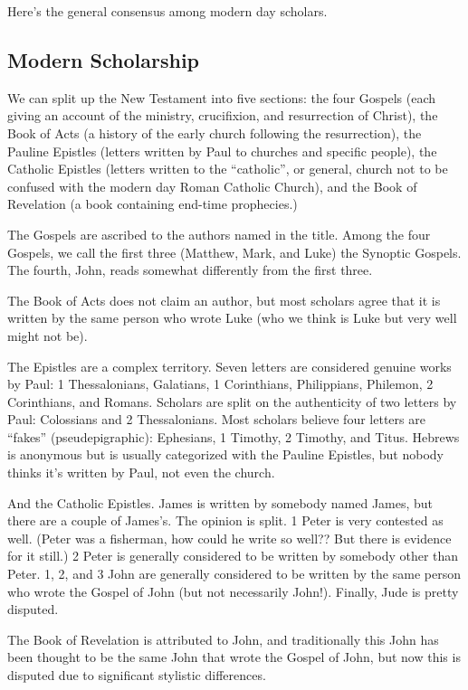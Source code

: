 \documentclass[12pt,letterpaper]{article}
\begin{document}
Here's the general consensus among modern day scholars.

\subsection{Modern Scholarship}

We can split up the New Testament into five sections: the four Gospels (each giving an account of the ministry, crucifixion, and resurrection of Christ), the Book of Acts (a history of the early church following the resurrection), the Pauline Epistles (letters written by Paul to churches and specific people), the Catholic Epistles (letters written to the ``catholic'', or general, church not to be confused with the modern day Roman Catholic Church), and the Book of Revelation (a book containing end-time prophecies.)

The Gospels are ascribed to the authors named in the title.  Among the four Gospels, we call the first three (Matthew, Mark, and Luke) the Synoptic Gospels.  The fourth, John, reads somewhat differently from the first three.

The Book of Acts does not claim an author, but most scholars agree that it is written by the same person who wrote Luke (who we think is Luke but very well might not be).  

The Epistles are a complex territory.  Seven letters are considered genuine works by Paul: 1 Thessalonians, Galatians, 1 Corinthians, Philippians, Philemon, 2 Corinthians, and Romans.  Scholars are split on the authenticity of two letters by Paul: Colossians and 2 Thessalonians.  Most scholars believe four letters are ``fakes'' (pseudepigraphic): Ephesians, 1 Timothy, 2 Timothy, and Titus.  Hebrews is anonymous but is usually categorized with the Pauline Epistles, but nobody thinks it's written by Paul, not even the church.

And the Catholic Epistles.  James is written by somebody named James, but there are a couple of James's.  The opinion is split.  1 Peter is very contested as well.  (Peter was a fisherman, how could he write so well??  But there is evidence for it still.)  2 Peter is generally considered to be written by somebody other than Peter.  1, 2, and 3 John are generally considered to be written by the same person who wrote the Gospel of John (but not necessarily John!).  Finally, Jude is pretty disputed.

The Book of Revelation is attributed to John, and traditionally this John has been thought to be the same John that wrote the Gospel of John, but now this is disputed due to significant stylistic differences.  
\end{document}
